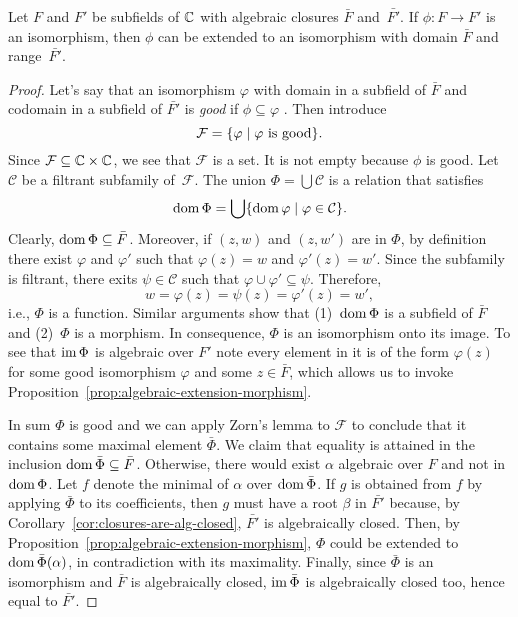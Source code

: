 \begin{thm}
    Let\/ $F$ and\/ $F'$ be subfields of\/ $\mathbb{C}$ with algebraic closures\/ $\bar F$ and\/~$\bar{F'}$. If\/ $\phi\colon F\to F'$ is an isomorphism, then\/ $\phi$ can be extended to an isomorphism with domain\/ $\bar F$ and range\/~$\bar{F'}$.
\end{thm}

\begin{proof}
    Let's say that an isomorphism $\varphi$ with domain in a subfield of $\bar F$ and codomain in a subfield of $\bar{F'}$ is \textsl{good} if $\phi\subseteq\varphi$ . Then introduce
    $$
        \mathcal F = \{\varphi\mid \varphi \text{ is good}\}.
    $$
    Since $\mathcal F\subseteq\mathbb{C}\times\mathbb{C}$, we see that $\mathcal F$ is a set. It is not empty because $\phi$ is good. Let $\mathcal C$ be a filtrant subfamily of~$\mathcal F$. The union $\Phi=\bigcup\mathcal C$ is a relation that satisfies 
    $$
        \operatorname{dom}\Phi = \bigcup\{\operatorname{dom}\varphi\mid\varphi\in\mathcal C\}.
    $$
    Clearly, $\operatorname{dom}\Phi\subseteq\bar F$. Moreover, if $(z,w)$ and $(z,w')$ are in $\Phi$, by definition there exist $\varphi$ and $\varphi'$ such that $\varphi(z)=w$ and $\varphi'(z)=w'$. Since the subfamily is filtrant, there exits $\psi\in\mathcal C$ such that $\varphi\cup\varphi'\subseteq\psi$. Therefore,
    $$
        w=\varphi(z)=\psi(z)=\varphi'(z)=w',
    $$
    i.e., $\Phi$ is a function. Similar arguments show that (1)~$\operatorname{dom}\Phi$ is a subfield of $\bar F$ and (2)~$\Phi$ is a morphism. In consequence, $\Phi$ is an isomorphism onto its image. To see that $\operatorname{im}\Phi$ is algebraic over $F'$ note every element in it is of the form $\varphi(z)$ for some good isomorphism $\varphi$ and some $z\in\bar F$, which allows us to invoke Proposition~\ref{prop:algebraic-extension-morphism}.

    In sum $\Phi$ is good and we can apply Zorn's lemma to $\mathcal F$ to conclude that it contains some maximal element $\bar\Phi$. We claim that equality is attained in the inclusion $\operatorname{dom}\bar\Phi\subseteq\bar F$. Otherwise, there would exist $\alpha$ algebraic over $F$ and not in $\operatorname{dom}\Phi$. Let $f$ denote the minimal of $\alpha$ over $\operatorname{dom}\bar\Phi$. If $g$ is obtained from $f$ by applying $\bar\Phi$ to its coefficients, then $g$ must have a root $\beta$ in $\bar{F'}$ because, by Corollary~\ref{cor:closures-are-alg-closed}, $\bar{F'}$ is algebraically closed. Then, by Proposition~\ref{prop:algebraic-extension-morphism}, $\Phi$ could be extended to $\operatorname{dom}\bar\Phi(\alpha)$, in contradiction with its maximality. Finally, since $\bar\Phi$ is an isomorphism and $\bar F$ is algebraically closed, $\operatorname{im}\bar\Phi$ is algebraically closed too, hence equal to $\bar{F'}$.
\end{proof}

